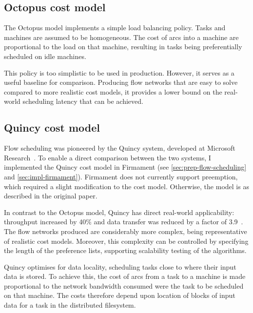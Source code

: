 \subsection{Octopus cost model} \label{sec:eval-benchmark-strategy-octopus}

The Octopus model implements a simple load balancing policy. Tasks and machines are assumed to be homogeneous. The cost of arcs into a machine are proportional to the load on that machine, resulting in tasks being preferentially scheduled on idle machines. 

This policy is too simplistic to be used in production. However, it serves as a useful baseline for comparison. Producing flow networks that are easy to solve compared to more realistic cost models, it provides a lower bound on the real-world scheduling latency that can be achieved.

\subsection{Quincy cost model} \label{sec:eval-benchmark-strategy-quincy}

Flow scheduling was pioneered by the Quincy system, developed at Microsoft Research~\cite{Isard:2009}. To enable a direct comparison between the two systems, I implemented the Quincy cost model in Firmament (see \cref{sec:prep-flow-scheduling} and \cref{sec:impl-firmament}). Firmament does not currently support preemption, which required a slight modification to the cost model\footnotemark. Otherwise, the model is as described in the original paper.

In contrast to the Octopus model, Quincy has direct real-world applicability: throughput increased by 40\% and data transfer was reduced by a factor of 3.9~\cite{Isard:2009}. The flow networks produced are considerably more complex, being representative of realistic cost models. Moreover, this complexity can be controlled by specifying the length of the preference lists, supporting scalability testing of the algorithms.

Quincy optimises for data locality, scheduling tasks close to where their input data is stored. To achieve this, the cost of arcs from a task to a machine is made proportional to the network bandwidth consumed were the task to be scheduled on that machine. The costs therefore depend upon location of blocks of input data for a task in the distributed filesystem.

